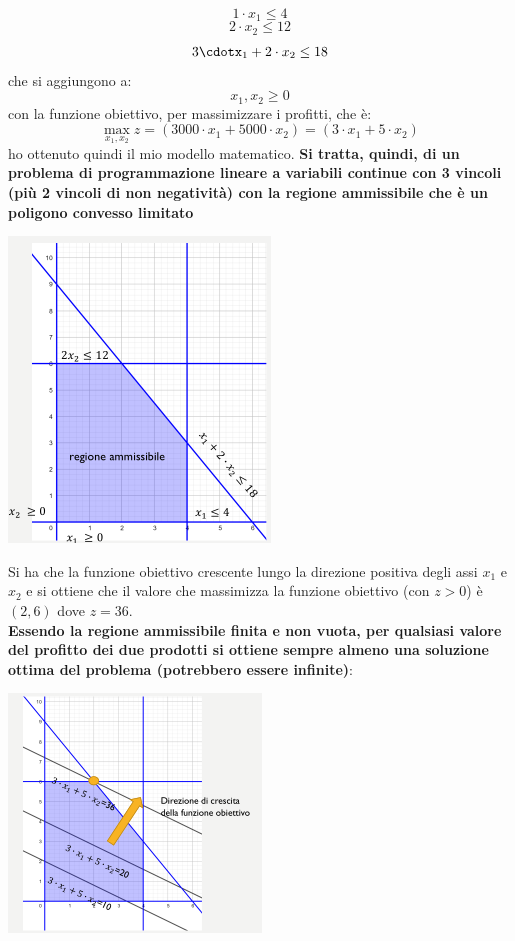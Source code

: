 \message{ !name(ro.tex)}\documentclass[a4paper,12pt, oneside]{book}
\begin{document}
\begin{esempio}
  \[1\cdot x_1\leq 4\]
  \[2\cdot x_2\leq 12\]
  \[3\cdotx_1+2\cdot x_2\leq 18\]
  che si aggiungono a:
  \[x_1,x_2\geq 0\]
  con la funzione obiettivo, per massimizzare i profitti, che è:
  \[\max_{x_1,x_2} z = (3000\cdot x_1+5000\cdot x_2) = (3\cdot
    x_1+5\cdot x_2)\]
  ho ottenuto quindi il mio modello matematico. \textbf{Si tratta,
    quindi, di un problema di programmazione lineare a variabili
    continue con 3 vincoli (più 2 vincoli di non negatività) con la
    regione ammissibile che è un poligono convesso limitato}
  \begin{center}
    \includegraphics[scale = 0.7]{img/3d7.png}
  \end{center}
  Si ha che la funzione obiettivo crescente lungo la
  direzione positiva degli assi $x_1$ e $x_2$ e si ottiene che il valore
  che massimizza la funzione obiettivo (con $z>0$) è $(2,6)$ dove $z =
  36$.\\
  \textbf{Essendo la regione ammissibile finita e non vuota, per
    qualsiasi valore del profitto dei due prodotti si ottiene sempre
    almeno una soluzione ottima del problema (potrebbero essere
    infinite)}:
  \begin{center}
    \includegraphics[scale = 0.8]{img/3d8.png}
  \end{center}
\end{esempio}
\end{document}
